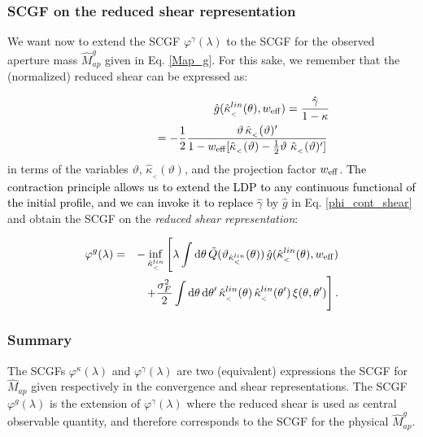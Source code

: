 \documentclass[twocolumn,aps,reprint, nofootinbib]{revtex4}
\newcommand{\dd}{{\rm d}}
\newcommand{\eff}{{\rm eff}}
\newcommand{\w}{{w_{\eff}}}
\newcommand{\hkappa}{\hat{\kappa}_{_<}}
\newcommand{\hgamma}{\hat{\gamma}}
\newcommand{\tQ}{\tilde{Q}}
\newcommand{\vark}{\vartheta_{\hkappa^{lin}}}
\newcommand{\Map}{\hat{M}_{ap}}
\newcommand{\Mapg}{\hat{M}_{ap}^g}
\newcommand{\varphik}{\varphi^{\kappa}}
\newcommand{\varphig}{\varphi^{\gamma}}
\newcommand{\varphir}{\varphi^{g}}
\newcommand{\pr}[1]{{\textcolor{black}{\textit{} #1}}}
\begin{document}
\subsubsection{SCGF on the reduced shear representation}

We want now to extend the SCGF $\varphig(\lambda)$ to the SCGF for the observed aperture mass $\Mapg$ given in Eq. \eqref{Map_g}. For this sake, we remember that the (normalized) reduced shear can be expressed as:

\begin{eqnarray}
& & \hat{g}(\hkappa^{lin}(\theta), \w)  =  \frac{\hat{\gamma}}{1-\kappa} \nonumber\\ &  & \phantom{\hat{g}(\hkappa^{lin}(\theta))} = - \frac{1}{2} \frac{\vartheta \, \hkappa(\vartheta)'}{1 - \w [ \hkappa(\vartheta) -\frac{1}{2} \vartheta \ \hkappa(\vartheta)']} \, 
\end{eqnarray}
in terms of the variables $\vartheta$, $\hkappa(\vartheta)$, and the projection factor $\w$. \pr{The contraction principle allows us to extend the LDP to any continuous functional of the initial profile, and we can invoke it to replace} $\hgamma$ by $\hat{g}$ in Eq. \eqref{phi_cont_shear} and obtain the SCGF on the \emph{reduced shear representation}:

\begin{eqnarray}
\label{phi_cont_g}
\varphir(\lambda) & = &  - \inf_{\hkappa^{lin}} \Bigg[  \lambda \int \dd \theta \, \tQ (\vark(\theta)) \, \hat{g}(\hkappa^{lin}(\theta), \w) \nonumber\\ & & + \frac{\sigma^2_{F}}{2} \int \dd \theta \, \dd \theta' \, \hkappa^{lin} (\theta) \, \hkappa^{lin} (\theta') \, \xi(\theta, \theta') \Bigg] \, .
\end{eqnarray}


\subsubsection{Summary}

The SCGFs $\varphik(\lambda)$ and $\varphig(\lambda)$ are two (equivalent) expressions the SCGF for $\Map$ given respectively in the convergence and shear representations. The SCGF $\varphir(\lambda)$ is the extension of $\varphig(\lambda)$ where the reduced shear is used as central observable quantity, and therefore corresponds to the SCGF for the physical $\Mapg$.
\end{document}
